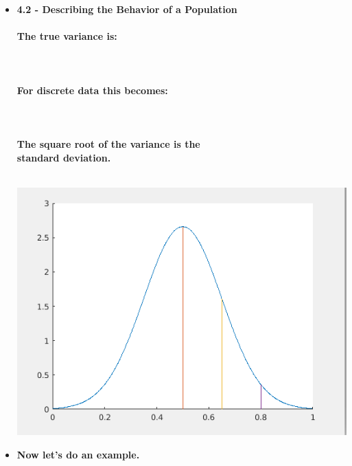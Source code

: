 \documentclass[11pt]{article}
\newcommand{\B}{\color{blue}}
\newcommand{\PR}{\color{mypurple}}
\begin{document}
\begin{itemize}
\begin{itemize}
		\end{itemize}
		
		\newpage
		\item \textbf{ \LARGE 4.2 -  Describing the Behavior of a Population  } \\\\
		
		\textbf{ \LARGE The true variance is:}\\\\
		 \\\\
		\textbf{ \LARGE For discrete data this becomes:}\\\\
		\\\\
		\textbf{\LARGE The square root of the {\bf \B variance} is the \\{\bf \PR standard deviation}.}\\\\
		
		
		
		\includegraphics[scale=1]{lecture1_fig1.png}

		\newpage
		\item \textbf{ \LARGE Now let's do an example.  } \\\\

		
\end{itemize}


	
\end{document}
